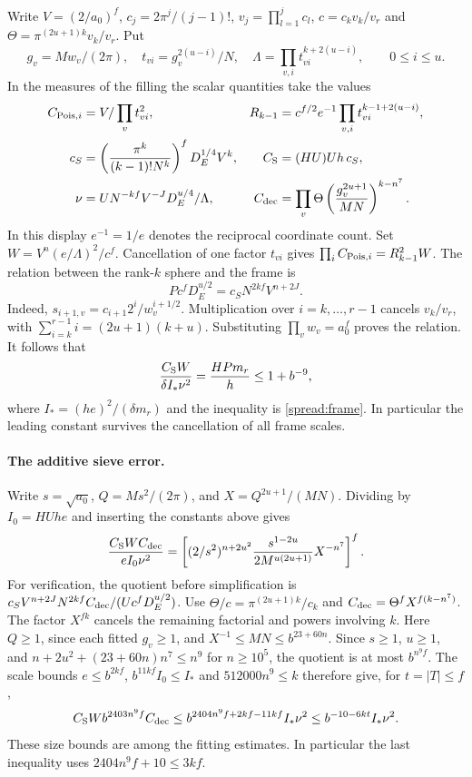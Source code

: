 Write \(V=(2/a_0)^f\), \(c_j=2\pi^j/(j-1)!\),
\(v_j=\prod_{l=1}^j c_l\), \(c=c_k v_k/v_r\) and
\(\Theta=\pi^{(2u+1)k}v_k/v_r\). Put
\[
 g_v=Mw_v/(2\pi),\quad t_{vi}=g_v^{2(u-i)}/N,\quad
 \Lambda=\prod_{v,i} t_{vi}^{k+2(u-i)},\qquad 0\le i\le u.
\]
In the measures of the filling the scalar quantities take the values
\[
\begin{aligned}
 C_{{\rm Pois},i}&= V/\prod_v t_{vi}^2,&
 R_{k-1}&=c^{f/2}e^{-1}\prod_{v,i}t_{vi}^{k-1+2(u-i)},\\
 c_S&=\left(\frac{\pi^k}{(k-1)!N^k}\right)^f D_E^{1/4}V^k,&
 C_{\rm S}&=(HU)Uh\,c_S,\\
 \nu&=U N^{-kf} V^{-J} D_E^{u/4}/\Lambda,&
 C_{\rm dec}&=\prod_v\Theta
  \left(\frac{g_v^{2u+1}}{MN}\right)^{k-n^7}.
\end{aligned}
\]
In this display \(e^{-1}=1/e\) denotes the reciprocal coordinate
count.  Set \(W=V^n(e/\Lambda)^2/c^f\). Cancellation of one
factor \(t_{vi}\) gives \(\prod_i C_{{\rm Pois},i}=R_{k-1}^2 W\).
The relation between the rank-\(k\) sphere and the frame is
\[
 P c^f D_E^{u/2}=c_S N^{2kf}V^{n+2J}.
\]
Indeed, \(s_{i+1,v}=c_{i+1}2^i/w_v^{i+1/2}\). Multiplication over
\(i=k,\ldots,r-1\) cancels \(v_k/v_r\), with
\(\sum_{i=k}^{r-1}i=(2u+1)(k+u)\). Substituting
\(\prod_v w_v=a_0^f\) proves the relation. It follows that
\[
 \frac{C_{\rm S}W}{\delta I_*\nu^2}
 = \frac{H P m_r}{h}\le 1+b^{-9},
\]
where \(I_*=(he)^2/(\delta m_r)\) and the inequality is
\eqref{spread:frame}. In particular the leading constant survives
the cancellation of all frame scales.

\paragraph{The additive sieve error.}
Write \(s=\sqrt{a_0}\), \(Q=Ms^2/(2\pi)\), and
\(X=Q^{2u+1}/(MN)\). Dividing by \(I_0=HUhe\) and inserting the
constants above gives
\[
 \frac{C_{\rm S}W C_{\rm dec}}{e I_0\nu^2}
 =\left[
  (2/s^2)^{n+2u^2}
  \frac{s^{1-2u}}{2 M^{u(2u+1)}} X^{-n^7}
 \right]^f .
\]
For verification, the quotient before simplification is
\(c_S V^{n+2J} N^{2kf} C_{\rm dec}/(U c^f D_E^{u/2})\).
Use \(\Theta/c=\pi^{(2u+1)k}/c_k\) and
\(C_{\rm dec}=\Theta^f X^{f(k-n^7)}\). The factor \(X^{fk}\)
cancels the remaining factorial and powers involving \(k\).
Here \(Q\ge1\), since each fitted \(g_v\ge1\), and
\(X^{-1}\le MN\le b^{23+60n}\). Since \(s\ge1\), \(u\ge1\),
and \(n+2u^2+(23+60n)n^7\le n^9\) for \(n\ge10^5\), the
quotient is at most \(b^{n^9 f}\). The scale bounds
\(e\le b^{2kf}\), \(b^{11kf}I_0\le I_*\) and \(512000n^9\le k\)
therefore give, for \(t=|T|\le f\),
\[
 C_{\rm S}W b^{2403n^9 f} C_{\rm dec}
    \le b^{2404n^9 f+2kf-11kf}I_*\nu^2
    \le b^{-10-6kt}I_*\nu^2 .
\]
These size bounds are among the fitting estimates. In particular the
last inequality uses \(2404n^9f+10\le 3kf\).

